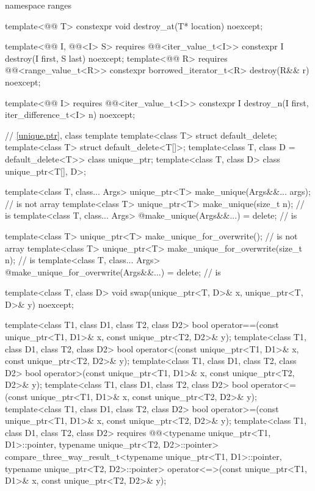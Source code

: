 \begin{codeblock}
{  namespace ranges {
    template<@@ T>
      constexpr void destroy_at(T* location) noexcept;

    template<@@ I, @@<I> S>
      requires @@<iter_value_t<I>>
        constexpr I destroy(I first, S last) noexcept;
    template<@@ R>
      requires @@<range_value_t<R>>
        constexpr borrowed_iterator_t<R> destroy(R&& r) noexcept;

    template<@@ I>
      requires @@<iter_value_t<I>>
        constexpr I destroy_n(I first, iter_difference_t<I> n) noexcept;
  }

  // \ref{unique.ptr}, class template 
  template<class T> struct default_delete;
  template<class T> struct default_delete<T[]>;
  template<class T, class D = default_delete<T>> class unique_ptr;
  template<class T, class D> class unique_ptr<T[], D>;

  template<class T, class... Args>
    unique_ptr<T> make_unique(Args&&... args);                                  //  is not array
  template<class T>
    unique_ptr<T> make_unique(size_t n);                                        //  is 
  template<class T, class... Args>
    @\unspecnc@ make_unique(Args&&...) = delete;                                //  is 

  template<class T>
    unique_ptr<T> make_unique_for_overwrite();                                  //  is not array
  template<class T>
    unique_ptr<T> make_unique_for_overwrite(size_t n);                          //  is 
  template<class T, class... Args>
    @\unspecnc@ make_unique_for_overwrite(Args&&...) = delete;                  //  is 

  template<class T, class D>
    void swap(unique_ptr<T, D>& x, unique_ptr<T, D>& y) noexcept;

  template<class T1, class D1, class T2, class D2>
    bool operator==(const unique_ptr<T1, D1>& x, const unique_ptr<T2, D2>& y);
  template<class T1, class D1, class T2, class D2>
    bool operator<(const unique_ptr<T1, D1>& x, const unique_ptr<T2, D2>& y);
  template<class T1, class D1, class T2, class D2>
    bool operator>(const unique_ptr<T1, D1>& x, const unique_ptr<T2, D2>& y);
  template<class T1, class D1, class T2, class D2>
    bool operator<=(const unique_ptr<T1, D1>& x, const unique_ptr<T2, D2>& y);
  template<class T1, class D1, class T2, class D2>
    bool operator>=(const unique_ptr<T1, D1>& x, const unique_ptr<T2, D2>& y);
  template<class T1, class D1, class T2, class D2>
    requires @@<typename unique_ptr<T1, D1>::pointer,
                                       typename unique_ptr<T2, D2>::pointer>
    compare_three_way_result_t<typename unique_ptr<T1, D1>::pointer,
                               typename unique_ptr<T2, D2>::pointer>
      operator<=>(const unique_ptr<T1, D1>& x, const unique_ptr<T2, D2>& y);

}
\end{codeblock}
